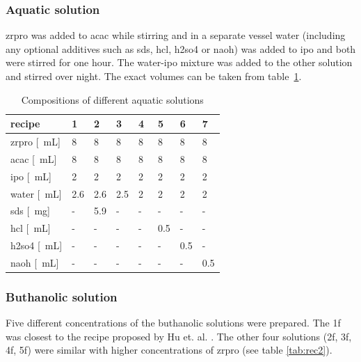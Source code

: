 \documentclass[a4paper]{article}
\newcommand{\td}[1]{\textcolor{red}{#1}}
\newcommand{\me}[1]{\textcolor{gray}{#1}}
\newcommand{\mg}[1]{\SI{#1}{\milli\gram}}
\newcommand{\ml}[1]{\SI{#1}{\milli\liter}}
\begin{document}
\subsubsection{Aquatic solution}
\gls{zrpro} was added to \gls{acac} while stirring and in a separate vessel \gls{water} (including any optional additives such as \gls{sds}, \gls{hcl}, \gls{h2so4} or \gls{naoh}) was added to \gls{ipo} and both were stirred for one hour. 
The \gls{water}-\gls{ipo} mixture was added to the other solution and stirred over night. 
The exact volumes can be taken from table~\ref{tab:rec1}.
\begin{table}[h]
	\centering
	\caption{Compositions of different aquatic solutions}
	\label{tab:rec1}
	\begin{tabular}{llllllll}
		\hline
		recipe				&1		&2		&3		&4		&5		&6		&7\\
		\hline
		\gls{zrpro} [\ml{}]	&8		&8		&8		&8		&8		&8		&8\\
		\gls{acac}  [\ml{}]	&8		&8		&8		&8		&8		&8		&8\\
		\gls{ipo}   [\ml{}]	&2		&2		&2		&2		&2		&2		&2\\
		\gls{water} [\ml{}]	&2.6	&2.6	&2.5	&2~		&2		&2		&2\\
		\gls{sds}   [\mg{}]	&-		&5.9	&-		&-		&-		&-		&-\\
		\gls{hcl}   [\ml{}]	&-		&-		&-		&-		&0.5	&-		&-\\
		\gls{h2so4} [\ml{}]	&-		&-		&-		&-		&-		&0.5	&-\\
		\gls{naoh}  [\ml{}] &-		&-		&-		&-		&-		&-		&0.5\\
		\hline
	\end{tabular}
\end{table}
%
\subsubsection{Buthanolic solution}
\label{sec:sol}
Five different concentrations of the buthanolic solutions were prepared. 
The \gls{1f} 
was closest to the recipe proposed by Hu et. al. \cite{Hu2016}. 
The other four solutions (\gls{2f}, \gls{3f}, \gls{4f}, \gls{5f}) were similar with higher concentrations of \gls{zrpro} (see table \ref{tab:rec2}).
\end{document}
